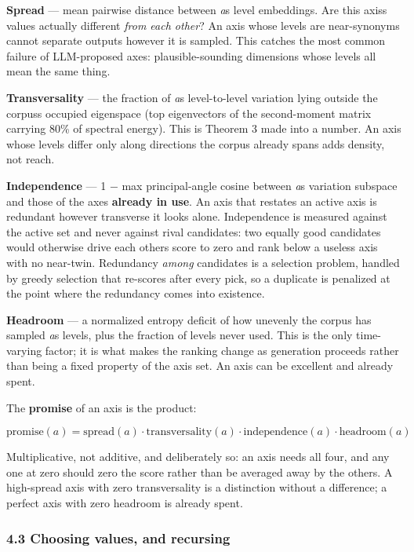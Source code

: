 \documentclass[
  11pt,
]{article}
\theoremstyle{plain}
\theoremstyle{definition}
\begin{document}
\textbf{Spread} --- mean pairwise distance between
\emph{a}\textquotesingle s level embeddings. Are this
axis\textquotesingle s values actually different \emph{from each other}?
An axis whose levels are near-synonyms cannot separate outputs however
it is sampled. This catches the most common failure of LLM-proposed
axes: plausible-sounding dimensions whose levels all mean the same
thing.

\textbf{Transversality} --- the fraction of \emph{a}\textquotesingle s
level-to-level variation lying outside the corpus\textquotesingle s
occupied eigenspace (top eigenvectors of the second-moment matrix
carrying 80\% of spectral energy). This is Theorem 3 made into a number.
An axis whose levels differ only along directions the corpus already
spans adds density, not reach.

\textbf{Independence} --- 1 − max principal-angle cosine between
\emph{a}\textquotesingle s variation subspace and those of the axes
\textbf{already in use}. An axis that restates an active axis is
redundant however transverse it looks alone. Independence is measured
against the active set and never against rival candidates: two equally
good candidates would otherwise drive each other\textquotesingle s score
to zero and rank below a useless axis with no near-twin. Redundancy
\emph{among} candidates is a selection problem, handled by greedy
selection that re-scores after every pick, so a duplicate is penalized
at the point where the redundancy comes into existence.

\textbf{Headroom} --- a normalized entropy deficit of how unevenly the
corpus has sampled \emph{a}\textquotesingle s levels, plus the fraction
of levels never used. This is the only time-varying factor; it is what
makes the ranking change as generation proceeds rather than being a
fixed property of the axis set. An axis can be excellent and already
spent.

The \textbf{promise} of an axis is the product:

\[
\mathrm{promise}(a) = \mathrm{spread}(a)\cdot\mathrm{transversality}(a)\cdot\mathrm{independence}(a)\cdot\mathrm{headroom}(a)
\]

Multiplicative, not additive, and deliberately so: an axis needs all
four, and any one at zero should zero the score rather than be averaged
away by the others. A high-spread axis with zero transversality is a
distinction without a difference; a perfect axis with zero headroom is
already spent.

\subsubsection{4.3 Choosing values, and
recursing}\label{43-choosing-values-and-recursing}
\end{document}
